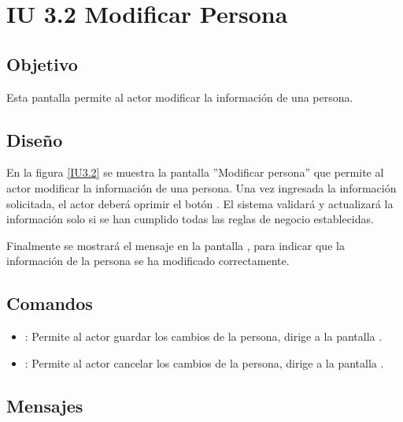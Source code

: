 \section{IU 3.2 Modificar Persona}

\subsection{Objetivo}
	Esta pantalla permite al actor modificar la información de una persona.
\subsection{Diseño}
	En la figura \ref{IU3.2} se muestra la pantalla ''Modificar persona'' que permite al actor modificar la información de una persona.
	Una vez ingresada la información solicitada, el actor deberá oprimir el botón  . El sistema validará y actualizará la información solo si se han cumplido todas las reglas de negocio establecidas.
	
	Finalmente se mostrará el mensaje  en la pantalla , para indicar que la información de la persona se ha modificado correctamente.

\label{IU3.2}
\subsection{Comandos}
\begin{itemize}
	\item {}: Permite al actor guardar los cambios de la persona, dirige a la pantalla .
	\item {}: Permite al actor cancelar los cambios de la persona, dirige a la pantalla .
\end{itemize}

\subsection{Mensajes}

